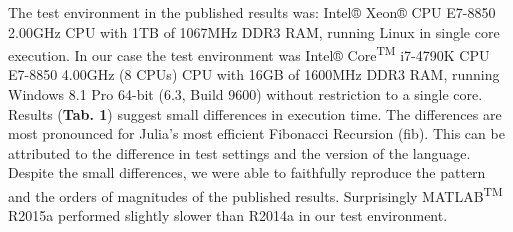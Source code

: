 The test environment in the published results was: Intel® Xeon® CPU E7-8850 2.00GHz CPU with 1TB of 1067MHz DDR3 RAM, running Linux in single core execution. In our case the test environment was Intel® Core\textsuperscript{TM} i7-4790K CPU E7-8850 4.00GHz (8 CPUs) CPU with 16GB of 1600MHz DDR3 RAM, running Windows 8.1 Pro 64-bit (6.3, Build 9600) without restriction to a single core. Results (\textbf{Tab. 1}) suggest small differences in execution time. The differences are most pronounced for Julia's most efficient Fibonacci Recursion (fib). This can be attributed to the difference in test settings and the version of the language. Despite the small differences, we were able to faithfully reproduce the pattern and the orders of magnitudes of the published results. Surprisingly MATLAB\textsuperscript{TM} R2015a performed slightly slower than R2014a in our test environment.

